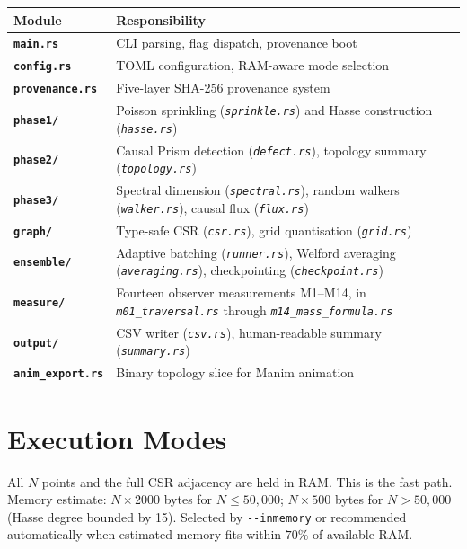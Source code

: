 \documentclass[11pt, a4paper, openany]{book}
\newcommand{\modname}[1]{\texttt{\bfseries\color{main}#1}}
\newcommand{\flag}[1]{\texttt{-{}-#1}}
\newcommand{\file}[1]{\texttt{\itshape #1}}
\begin{document}
\begin{longtable}{lp{9cm}}
  \toprule
  \textbf{Module} & \textbf{Responsibility} \\
  \midrule
  \modname{main.rs}        & CLI parsing, flag dispatch, provenance boot \\
  \modname{config.rs}      & TOML configuration, RAM-aware mode selection \\
  \modname{provenance.rs}  & Five-layer SHA-256 provenance system \\
  \modname{phase1/}        & Poisson sprinkling (\file{sprinkle.rs}) and Hasse
                             construction (\file{hasse.rs}) \\
  \modname{phase2/}        & Causal Prism detection (\file{defect.rs}),
                             topology summary (\file{topology.rs}) \\
  \modname{phase3/}        & Spectral dimension (\file{spectral.rs}),
                             random walkers (\file{walker.rs}),
                             causal flux (\file{flux.rs}) \\
  \modname{graph/}         & Type-safe CSR (\file{csr.rs}),
                             grid quantisation (\file{grid.rs}) \\
  \modname{ensemble/}      & Adaptive batching (\file{runner.rs}),
                             Welford averaging (\file{averaging.rs}),
                             checkpointing (\file{checkpoint.rs}) \\
  \modname{measure/}       & Fourteen observer measurements M1--M14, in
                             \file{m01\_traversal.rs} through \file{m14\_mass\_formula.rs} \\
  \modname{output/}        & CSV writer (\file{csv.rs}),
                             human-readable summary (\file{summary.rs}) \\
  \modname{anim\_export.rs} & Binary topology slice for Manim animation \\
  \bottomrule
\end{longtable}

\section{Execution Modes}

\begin{definition}
  All $N$ points and the full CSR adjacency are held in RAM.  This is the fast
  path.  Memory estimate: $N \times 2000$ bytes for $N \leq 50{,}000$;
  $N \times 500$ bytes for $N > 50{,}000$ (Hasse degree bounded by 15).
  Selected by \flag{inmemory} or recommended automatically when estimated memory
  fits within $70\%$ of available RAM.
\end{definition}
\end{document}
